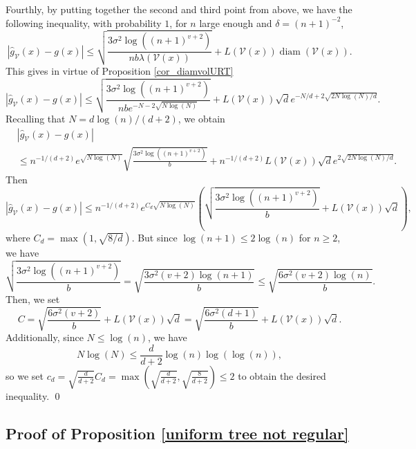 \documentclass[paper=a4, fontsize=11pt]{scrartcl}
\newcommand{\diam}{\operatorname{diam}}
\begin{document}
Fourthly, by putting together the second and third point from above, we have the following inequality, with probability $1$, for $n $ large enough and $\delta = (n+1)^{-2}$,
$$|\hat g_{\mathcal V}(x) - g(x)| \leq \sqrt{\frac{ 3 \sigma^2 \log\left( (n+1)^{v+2} \right)}{n  b \lambda ( \mathcal V(x)) }} + L(\mathcal V(x)) \diam (\mathcal V(x)).$$
This gives in virtue of Proposition \ref{cor_diamvolURT}
$$| \hat g_{\mathcal V}(x) - g(x)| \leq \sqrt{\frac{ 3 \sigma^2 \log\left( (n+1)^{v+2}\right)}{n b e^{-N - 2\sqrt{N \log(N)}}}} + L(\mathcal V(x)) \sqrt d e^{-N/d + 2\sqrt{2N \log(N)/d}}.$$
Recalling that \( N = d\log(n)/(d+2) \), we obtain
\begin{align*}
    &| \hat g_{\mathcal V}(x) - g(x)| \\ & \leq n^{-1/(d+2)} e^{\sqrt{N \log(N)}} \sqrt{\frac{ 3 \sigma^2 \log\left( (n+1)^{v+2} \right)}{b}} + n^{-1/(d+2)} L(\mathcal V(x)) \sqrt d e^{2\sqrt{2N \log(N)/d}}.
\end{align*}
Then
\[
| \hat g_{\mathcal V}(x) - g(x)| \leq n^{-1/(d+2)} e^{C_d \sqrt{N \log(N)}} \left( \sqrt{\frac{ 3 \sigma^2 \log\left( (n+1)^{v+2} \right)}{b}} + L(\mathcal V(x)) \sqrt d \right),
\]
where \(C_d = \max(1, \sqrt{8/d})\). But since $\log(n+1) \leq 2 \log(n)$ for $n\geq2$, we have
\[
\sqrt{\frac{ 3 \sigma^2 \log\left( (n+1)^{v+2}\right)}{b}} = \sqrt{\frac{ 3 \sigma^2 (v+2) \log(n+1)}{b}} \leq \sqrt{\frac{ 6 \sigma^2 (v+2) \log(n)}{b}}.
\]
Then, we set $$C = \sqrt{\frac{ 6 \sigma^2 (v+2)}{b}} + L(\mathcal V(x)) \sqrt d = \sqrt{\frac{ 6 \sigma^2 (d+1)}{b}}+ L(\mathcal V(x)) \sqrt d.$$
Additionally, since \(N \leq \log(n)\), we have 
\[
N \log(N) \leq \frac{d}{d+2} \log(n) \log(\log(n)),
\]
so we set \(c_d = \sqrt{\frac{d}{d+2}} C_d = \max\left(\sqrt{\frac{d}{d+2}}, \sqrt{\frac{8}{d+2}}\right) \leq 2 \) to obtain the desired inequality.
\qed

\subsection*{Proof of Proposition \ref{uniform tree not regular}}
\end{document}
